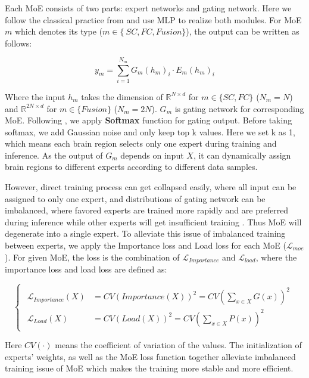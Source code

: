 \documentclass[10pt,twocolumn,letterpaper]{article}
\begin{document}
Each MoE consists of two parts: expert networks and gating network. Here we follow the classical practice from \cite{shazeer2017outrageously} and use MLP to realize both modules. For MoE $m$ which denotes its type ($m \in \{\ SC, FC, Fusion\}$), the output can be written as follows:
\begin{small}
\begin{equation}
    y_m = \sum_{i=1}^{N_m} G_m(h_m)_i \cdot E_m(h_m)_i
\end{equation}
\end{small}

Where the input $h_m$ takes the dimension of $\mathbb{R}^{N\times d}$ for $m \in \{SC, FC\}$ ($N_m=N$) and $\mathbb{R}^{2N\times d}$ for $m\in \{Fusion\}$ ($N_m=2N$). $G_m$ is gating network for corresponding MoE. Following \cite{shazeer2017outrageously}, we apply \textbf{Softmax} function for gating output. Before taking softmax, we add Gaussian noise and only keep top k values. Here we set k as 1, which means each brain region selects only one expert during training and inference. As the output of $G_m$ depends on input $X$, it can dynamically assign brain regions to different experts according to different data samples.

However, direct training process can get collapsed easily, where all input can be assigned to only one expert, and distributions of gating network can be imbalanced, where favored experts are trained more rapidly and are preferred during inference while other experts will get insufficient training \cite{chi2022representation,shazeer2017outrageously}. Thus MoE will degenerate into a single expert. To alleviate this issue of imbalanced training between experts, we apply the Importance loss and Load loss for each MoE ($\mathcal{L}_{moe}$). For given MoE, the loss is the combination of $\mathcal{L}_{Importance}$ and $\mathcal{L}_{load}$,
where the importance loss and load loss are defined as:
\begin{small}
\begin{equation}
\begin{cases}
\begin{aligned}
    \mathcal{L}_{Importance}(X) &= CV(Importance(X))^2 = CV(\sum_{x\in X}G(x))^2
    \\
    \mathcal{L}_{Load}(X) &= CV(Load(X))^2 = CV(\sum_{x\in X}P(x))^2
    \label{equ_moe}
\end{aligned}
\end{cases}
\end{equation}
\end{small}
Here $CV(\cdot)$ means the coefficient of variation of the values. The initialization of experts' weights, as well as the MoE loss function together alleviate imbalanced training issue of MoE which makes the training more stable and more efficient.
\end{document}

